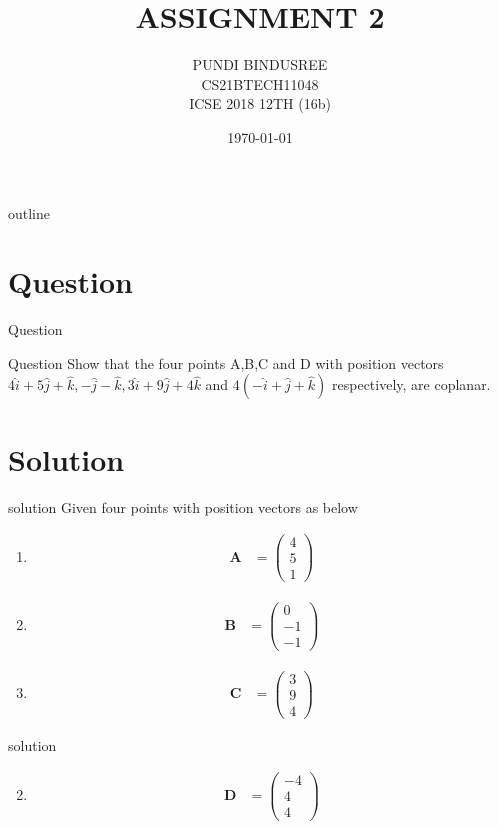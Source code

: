 \documentclass{beamer}
\title{ASSIGNMENT 2}
\author{PUNDI BINDUSREE \\ CS21BTECH11048\\ ICSE 2018 12TH (16b)}
\date{\today}
\let\vec\mathbf
\newcommand{\myvec}[1]{\ensuremath{\begin{pmatrix}#1\end{pmatrix}}}
\begin{document}
\begin{frame}
\titlepage
\end{frame}

\logo{}
\begin{frame}{outline}
\tableofcontents
\end{frame}

\section{Question}
\begin{frame}{Question}
\begin{block}{Question}
Show that the four points A,B,C and D with position vectors $4\hat{i}+5\hat{j}+\hat{k},-\hat{j}-\hat{k},3\hat{i}+9\hat{j}+4\hat{k}$ and $4(-\hat{i}+\hat{j}+\hat{k})$ respectively, are coplanar.
\end{block}
\end{frame}


\section{Solution}
\begin{frame}{solution}
 Given four points with position vectors as below
\begin{enumerate}
     \item \begin{align}\vec{A} & =\myvec{4\\5\\1}\end{align}
     \item \begin{align}\vec{B} & =\myvec{0\\-1\\-1}\end{align}     
     \item \begin{align}\vec{C} & =\myvec{3\\9\\4}\end{align}     
\end{enumerate}
\end{frame}


\begin{frame}{solution}
\begin{enumerate}
\setcounter{enumi}{1}
\item \begin{align}\vec{D} & =\myvec{-4\\4\\4}\end{align}
\end{enumerate}
\end{frame}
 
\end{document}
